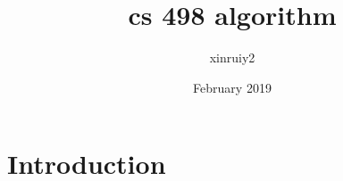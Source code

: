 \documentclass{article}
\title{cs 498 algorithm}
\author{xinruiy2 }
\date{February 2019}
\begin{document}
\maketitle

\section{Introduction}
\end{document}
